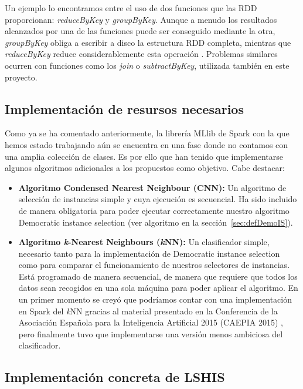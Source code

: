Un ejemplo lo encontramos entre el uso de dos funciones que las RDD proporcionan: \textit{reduceByKey} y \textit{groupByKey}. Aunque a menudo los resultados alcanzados por una de las funciones puede ser conseguido mediante la otra, \textit{groupByKey} obliga a escribir a disco la estructura RDD completa, mientras que \textit{reduceByKey} reduce considerablemente esta operación \cite{ShuffleSpark}. Problemas similares ocurren con funciones como los \textit{join} o \textit{subtractByKey}, utilizada también en este proyecto.

\subsection{Implementación de resursos necesarios}\label{sec:ImplRecursosAdicionales}

Como ya se ha comentado anteriormente, la librería MLlib de Spark con la que hemos estado trabajando aún se encuentra en una fase donde no contamos con una amplia colección de clases. Es por ello que han tenido que implementarse algunos algoritmos adicionales a los propuestos como objetivo. Cabe destacar:

\begin{itemize}
\item \textbf{Algoritmo Condensed Nearest Neighbour (CNN):} Un algoritmo de selección de instancias simple y cuya ejecución es secuencial. Ha sido incluido de manera obligatoria para poder ejecutar correctamente nuestro algoritmo Democratic instance selection (ver algoritmo en la sección~\ref{sec:defDemoIS}).
\item  \textbf{Algoritmo \textit{k}-Nearest Neighbours (\textit{k}NN):} Un clasificador simple, necesario tanto para la implementación de Democratic instance selection como para comparar el funcionamiento de nuestros selectores de instancias. Está programado de manera secuencial, de manera que requiere que todos los datos sean recogidos en una sola máquina para poder aplicar el algoritmo. En un primer momento se creyó que podríamos contar con una implementación en Spark del \textit{k}NN gracias al material presentado en la Conferencia de la Asociación Española para la Inteligencia Artificial 2015 (CAEPIA 2015) \cite{KNNConferencia}, pero finalmente tuvo que implementarse una versión menos ambiciosa del clasificador.
\end{itemize}


\subsection{Implementación concreta de LSHIS}

